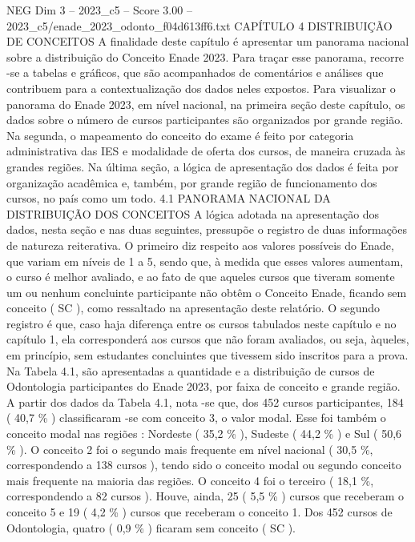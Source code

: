 \begin{textsample}{NEG Dim 3 – 2023\_c5 – Score 3.00 – 2023\_c5/enade\_2023\_odonto\_f04d613ff6.txt}  \label{ex:f3_neg_226}
CAPÍTULO 4 DISTRIBUIÇÃO DE CONCEITOS A finalidade deste capítulo é apresentar um panorama nacional sobre a distribuição do Conceito Enade 2023.
Para traçar esse panorama, recorre -se a tabelas e gráficos, que são acompanhados de comentários e análises que contribuem para a contextualização dos dados neles expostos.
Para visualizar o panorama do Enade 2023, em nível nacional, na primeira seção deste capítulo, os dados sobre o número de cursos participantes são organizados por grande região.
Na segunda, o mapeamento do conceito do exame é feito por categoria administrativa das IES e modalidade de oferta dos cursos, de maneira cruzada às grandes regiões.
Na última seção, a lógica de apresentação dos dados é feita por organização acadêmica e, também, por grande região de funcionamento dos cursos, no país como um todo. 4.1 PANORAMA NACIONAL DA DISTRIBUIÇÃO DOS CONCEITOS A lógica adotada na apresentação dos dados, nesta seção e nas duas seguintes, pressupõe o registro de duas informações de natureza reiterativa.
O primeiro diz respeito aos valores possíveis do Enade, que variam em níveis de 1 a 5, sendo que, à medida que esses valores aumentam, o curso é melhor avaliado, e ao fato de que aqueles cursos que tiveram somente um ou nenhum concluinte participante não obtêm o Conceito Enade, ficando sem conceito ( SC ), como ressaltado na apresentação deste relatório.
O segundo registro é que, caso haja diferença entre os cursos tabulados neste capítulo e no capítulo 1, ela corresponderá aos cursos que não foram avaliados, ou seja, àqueles, em princípio, sem estudantes concluintes que tivessem sido inscritos para a prova.
Na Tabela 4.1, são apresentadas a quantidade e a distribuição de cursos de Odontologia participantes do Enade 2023, por faixa de conceito e grande região.
A partir dos dados da Tabela 4.1, nota -se que, dos 452 cursos participantes, 184 ( 40,7 \% ) classificaram -se com conceito 3, o valor modal.
Esse foi também o conceito modal nas regiões : Nordeste ( 35,2 \% ), Sudeste ( 44,2 \% ) e Sul ( 50,6 \% ).
O conceito 2 foi o segundo mais frequente em nível nacional ( 30,5 \%, correspondendo a 138 cursos ), tendo sido o conceito modal ou segundo conceito mais frequente na maioria das regiões.
O conceito 4 foi o terceiro ( 18,1 \%, correspondendo a 82 cursos ).
Houve, ainda, 25 ( 5,5 \% ) cursos que receberam o conceito 5 e 19 ( 4,2 \% ) cursos que receberam o conceito 1.
Dos 452 cursos de Odontologia, quatro ( 0,9 \% ) ficaram sem conceito ( SC ).

\end{textsample}
